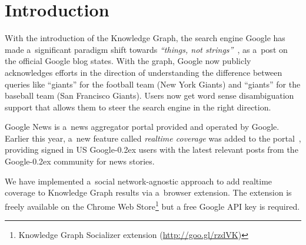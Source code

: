 \documentclass[runningheads,a4paper]{llncs}
\newcommand{\googleplus}{Google\nolinebreak\hspace{0em}\raisebox{.28ex}{\tiny\bf +}\kern-0.2ex\xspace}
\begin{document}

\section{Introduction}
With the introduction of the Knowledge Graph, the search engine Google
has made a~significant paradigm shift towards \textit{``things, not strings''}~\cite{singhal2012},
as a~post on the official Google blog states.
With the graph, Google now publicly acknowledges efforts in the direction of
understanding the difference between queries like ``giants''
for the football team (New York Giants)
and ``giants'' for the baseball team (San Francisco Giants).
Users now get word sense disambiguation support that allows them
to steer the search engine in the right direction.

Google News is a~news aggregator portal provided and operated by Google.
Earlier this year, a~new feature called \emph{realtime coverage}
was added to the portal~\cite{zuccarino2012}, providing signed in US \googleplus users
with the latest relevant posts from the \googleplus community for news stories.

We have implemented a~social network-agnostic approach
to add realtime coverage to Knowledge Graph results via a~browser extension.
The extension is freely available on the Chrome Web
Store\footnote{Knowledge Graph Socializer extension (\url{http://goo.gl/rzdVK})} but a free Google API key is required.

\end{document}
